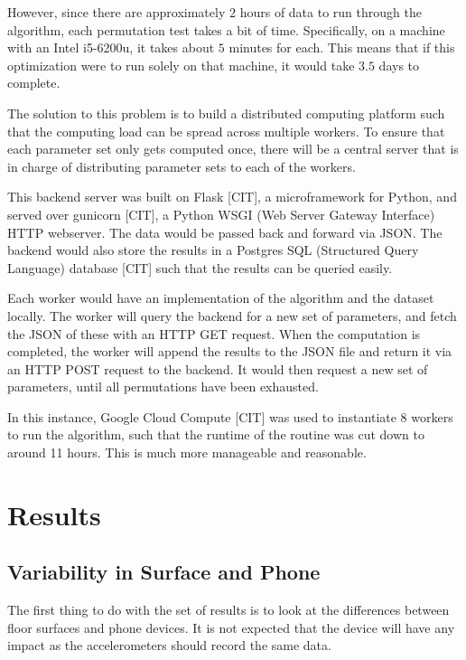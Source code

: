         However, since there are approximately $2$ hours of data to run through the algorithm, each permutation test takes a bit of time. Specifically, on a machine with an Intel i5-6200u, it takes about $5$ minutes for each. This means that if this optimization were to run solely on that machine, it would take $3.5$ days to complete.

        The solution to this problem is to build a distributed computing platform such that the computing load can be spread across multiple workers. To ensure that each parameter set only gets computed once, there will be a central server that is in charge of distributing parameter sets to each of the workers. 

        This backend server was built on Flask [CIT], a microframework for Python, and served over gunicorn [CIT], a Python WSGI (Web Server Gateway Interface) HTTP webserver. The data would be passed back and forward via JSON. The backend would also store the results in a Postgres SQL (Structured Query Language) database [CIT] such that the results can be queried easily.

        Each worker would have an implementation of the algorithm and the dataset locally. The worker will query the backend for a new set of parameters, and fetch the JSON of these with an HTTP GET request. When the computation is completed, the worker will append the results to the JSON file and return it via an HTTP POST request to the backend. It would then request a new set of parameters, until all permutations have been exhausted.

        In this instance, Google Cloud Compute [CIT] was used to instantiate 8 workers to run the algorithm, such that the runtime of the routine was cut down to around 11 hours. This is much more manageable and reasonable.

    \chapter{Results}

        \section{Variability in Surface and Phone}

            The first thing to do with the set of results is to look at the differences between floor surfaces and phone devices. It is not expected that the device will have any impact as the accelerometers should record the same data.

